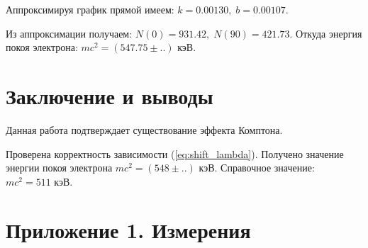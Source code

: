 \documentclass[12pt,a4paper]{article}
\begin{document}
        Аппроксимируя график прямой имеем: $k = 0.00130, \; b = 0.00107$.

        Из аппроксимации получаем: $N(0) = 931.42, \; N(90) = 421.73$.
        Откуда энергия покоя электрона: $mc^2 = (547.75 \pm ..)$ кэВ.

	\section*{Заключение и выводы}
	
	Данная работа подтверждает существование эффекта Комптона.
	
	Проверена корректность зависимости (\ref{eq:shift_lambda}). Получено значение энергии покоя электрона $mc^2 = (548 \pm ..)$ кэВ. Справочное значение: $mc^2 = 511$ кэВ.
	
	
	
	\newpage
	\section*{Приложение 1. Измерения}
	
\end{document}
